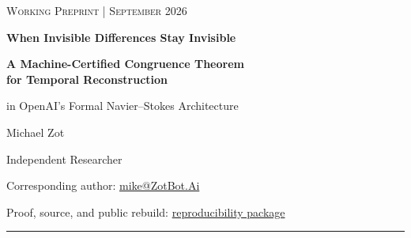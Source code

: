 \documentclass[11pt]{article}
\theoremstyle{highend}
\theoremstyle{definition}
\begin{document}
\thispagestyle{empty}
\begin{center}
  \vspace*{0.18in}
  {\small\scshape Working Preprint \quad | \quad September 2026}\par
  \vspace{0.13in}
  {\fontsize{23}{27}\selectfont\bfseries When Invisible Differences Stay Invisible\par}
  \vspace{0.08in}
  {\fontsize{16.2}{20}\selectfont\bfseries
  A Machine-Certified Congruence Theorem\\
  for Temporal Reconstruction\par}
  \vspace{0.06in}
  {\large in OpenAI's Formal Navier--Stokes Architecture\par}
  \vspace{0.20in}
  {\large Michael Zot}\par
  \vspace{0.055in}
  {\small Independent Researcher}\par
  \vspace{0.038in}
  {\small Corresponding author: \href{mailto:mike@ZotBot.Ai}{mike@ZotBot.Ai}}\par
  \vspace{0.038in}
  {\small Proof, source, and public rebuild: \href{https://github.com/mikecreation/ZotBot/tree/main/research/navier-stokes-spc/temporal-closure}{reproducibility package}}\par
  \vspace{0.11in}
  \rule{0.72\textwidth}{0.45pt}\par
  \vspace{0.14in}
\end{center}
\end{document}
